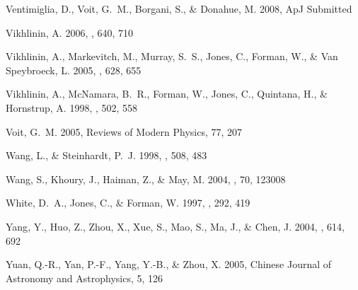 \documentclass[apj]{emulateapj}
\begin{document}
\begin{thebibliography}{}
{Ventimiglia}, D., {Voit}, G.~M., {Borgani}, S., \& {Donahue}, M. 2008, ApJ
  Submitted

{Vikhlinin}, A. 2006, \apj, 640, 710

{Vikhlinin}, A., {Markevitch}, M., {Murray}, S.~S., {Jones}, C., {Forman}, W.,
  \& {Van Speybroeck}, L. 2005, \apj, 628, 655

{Vikhlinin}, A., {McNamara}, B.~R., {Forman}, W., {Jones}, C., {Quintana}, H.,
  \& {Hornstrup}, A. 1998, \apj, 502, 558

{Voit}, G.~M. 2005, Reviews of Modern Physics, 77, 207

{Wang}, L., \& {Steinhardt}, P.~J. 1998, \apj, 508, 483

{Wang}, S., {Khoury}, J., {Haiman}, Z., \& {May}, M. 2004, \prd, 70, 123008

{White}, D.~A., {Jones}, C., \& {Forman}, W. 1997, \mnras, 292, 419

{Yang}, Y., {Huo}, Z., {Zhou}, X., {Xue}, S., {Mao}, S., {Ma}, J., \& {Chen},
  J. 2004, \apj, 614, 692

{Yuan}, Q.-R., {Yan}, P.-F., {Yang}, Y.-B., \& {Zhou}, X. 2005, Chinese Journal
  of Astronomy and Astrophysics, 5, 126

\end{thebibliography}


\end{document}
